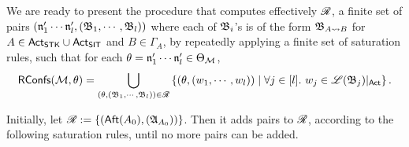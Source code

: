We are ready to present the procedure that computes effectively $\mathscr{R}$, a finite set of pairs $(\mathfrak{n}'_1 \cdots \mathfrak{n}'_l, ({\mathfrak{B} }_1, \cdots, {\mathfrak{B} }_l))$ where each of ${\mathfrak{B} }_i$'s is of the form ${\mathfrak{B} }_{A\rightsquigarrow B}$ for $A \in {\sf Act}_{\sf STK}\cup{\sf Act}_{\sf SIT}$ and $B \in \Gamma_A$, by repeatedly applying a finite set of saturation rules, such that
for each $\theta = \mathfrak{n}'_1 \cdots \mathfrak{n}'_{l} \in \Theta_{\mathcal{M} }$, 
$$\mathsf{RConfs}({\mathcal{M} }, \theta) =\bigcup \limits_{(\theta, ({\mathfrak{B} }_1, \cdots, {\mathfrak{B} }_l)) \in \mathscr{R}} \left\{(\theta, (w_1, \cdots, w_{l})) \mid \forall j \in [l].\ w_j \in {\mathscr{L} }({\mathfrak{B} }_{j})|_{{\sf Act}} \right\}.$$


Initially, let $\mathscr{R} := \{({\sf Aft}(A_0),({\mathfrak{A} }_{A_0}))\}$.
Then it adds pairs to $\mathscr{R}$, according to the following saturation rules, until no more pairs can be added. 

